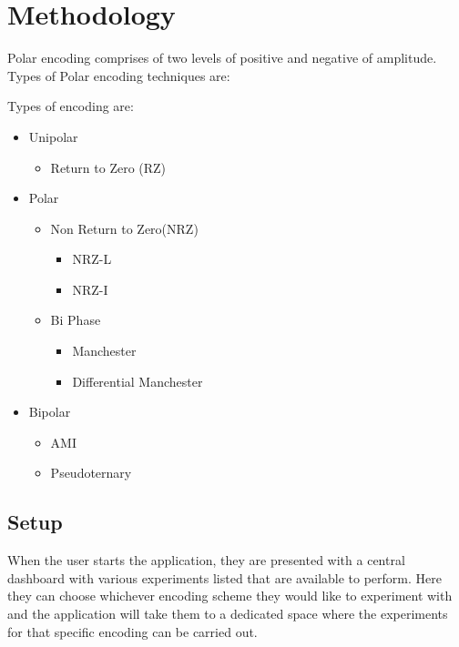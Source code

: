 \documentclass[10pt,journal,compsoc]{IEEEtran}
\begin{document}
\section{Methodology}

Polar encoding comprises of two levels of positive and negative of amplitude. Types of Polar encoding techniques are:                   

Types of encoding are: 
\begin{itemize}
    \item Unipolar
        \begin{itemize}
             \item Return to Zero (RZ)
           \end{itemize}
     \item Polar
     \begin{itemize}
      \item Non Return to Zero(NRZ)
           \begin{itemize}
             \item NRZ-L
             \item NRZ-I
           \end{itemize}
      \item Bi Phase
           \begin{itemize}
             \item Manchester
             \item Differential Manchester
           \end{itemize}
    \end{itemize}
    \item Bipolar
           \begin{itemize}
             \item AMI
             \item Pseudoternary
           \end{itemize}
\end{itemize}



\subsection{Setup}
When the user starts the application, they are presented with a central dashboard with various experiments listed that are available to perform. Here they can choose whichever encoding scheme they would like to experiment with and the application will take them to a dedicated space where the experiments for that specific encoding can be carried out.
\end{document}
